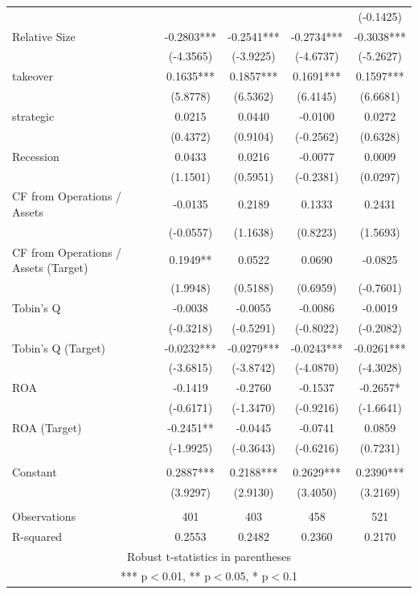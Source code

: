 \documentclass[12pt]{article}
\begin{document}
\begin{table}[!htbp]
\begin{adjustbox}{max width=\textwidth}
\begin{tabular}{lcccc}
			 &  &  &  & (-0.1425) \\
			Relative Size& -0.2803*** & -0.2541*** & -0.2734*** & -0.3038*** \\
			 & (-4.3565) & (-3.9225) & (-4.6737) & (-5.2627) \\
			takeover & 0.1635*** & 0.1857*** & 0.1691*** & 0.1597*** \\
			 & (5.8778) & (6.5362) & (6.4145) & (6.6681) \\
			strategic & 0.0215 & 0.0440 & -0.0100 & 0.0272 \\
			 & (0.4372) & (0.9104) & (-0.2562) & (0.6328) \\
			Recession & 0.0433 & 0.0216 & -0.0077 & 0.0009 \\
			 & (1.1501) & (0.5951) & (-0.2381) & (0.0297) \\
			CF from Operations / Assets & -0.0135 & 0.2189 & 0.1333 & 0.2431 \\
			 & (-0.0557) & (1.1638) & (0.8223) & (1.5693) \\
			CF from Operations / Assets (Target) & 0.1949** & 0.0522 & 0.0690 & -0.0825 \\
			 & (1.9948) & (0.5188) & (0.6959) & (-0.7601) \\
			Tobin's Q & -0.0038 & -0.0055 & -0.0086 & -0.0019 \\
			 & (-0.3218) & (-0.5291) & (-0.8022) & (-0.2082) \\
			Tobin's Q (Target) & -0.0232*** & -0.0279*** & -0.0243*** & -0.0261*** \\
			 & (-3.6815) & (-3.8742) & (-4.0870) & (-4.3028) \\
			ROA & -0.1419 & -0.2760 & -0.1537 & -0.2657* \\
			 & (-0.6171) & (-1.3470) & (-0.9216) & (-1.6641) \\
			ROA (Target) & -0.2451** & -0.0445 & -0.0741 & 0.0859 \\
			 & (-1.9925) & (-0.3643) & (-0.6216) & (0.7231) \\
			 &  &  &  &  \\
			Constant & 0.2887*** & 0.2188*** & 0.2629*** & 0.2390*** \\
			 & (3.9297) & (2.9130) & (3.4050) & (3.2169) \\
			 &  &  &  &  \\
			Observations & 401 & 403 & 458 & 521 \\
			 R-squared & 0.2553 & 0.2482 & 0.2360 & 0.2170 \\ \hline
			\multicolumn{5}{c}{ Robust t-statistics in parentheses} \\
			\multicolumn{5}{c}{ *** p$<$0.01, ** p$<$0.05, * p$<$0.1} \\
			\end{tabular}
				
	\end{adjustbox}
\end{table}
\end{document}
